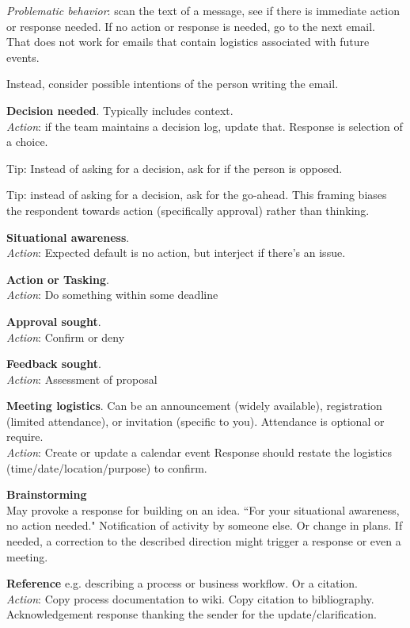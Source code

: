 \textit{Problematic behavior}: scan the text of a message, see if there is immediate action or response needed. If no action or response is needed, go to the next email. \\
 That does not work for emails that contain logistics associated with future events. 

Instead, consider possible intentions of the person writing the email. 

\textbf{Decision needed}. Typically includes context. \\
\textit{Action}: if the team maintains a decision log, update that.
Response is selection of a choice.

Tip: Instead of asking for a decision, ask for if the person is opposed.

Tip: instead of asking for a decision, ask for the go-ahead. This framing biases the respondent towards action (specifically approval) rather than thinking. 

\textbf{Situational awareness}.\\
\textit{Action}: Expected default is no action, but interject if there's an issue.


\textbf{Action or Tasking}.\\
\textit{Action}: Do something within some deadline

\textbf{Approval sought}.\\
\textit{Action}: Confirm or deny

\textbf{Feedback sought}.\\
\textit{Action}: Assessment of proposal


\textbf{Meeting logistics}. Can be an announcement (widely available), registration (limited attendance), or invitation (specific to you). Attendance is optional or require. \\
\textit{Action}: Create or update a calendar event
Response should restate the logistics (time/date/location/purpose) to confirm. 

\textbf{Brainstorming}\\
May provoke a response for building on an idea.
``For your situational awareness, no action needed." Notification of activity by someone else. Or change in plans. 
If needed, a correction to the described direction might trigger a response or even a meeting.

\textbf{Reference} e.g. describing a process or business workflow. Or a citation.\\
\textit{Action}: Copy process documentation to wiki. Copy citation to bibliography.
Acknowledgement response thanking the sender for the update/clarification.

